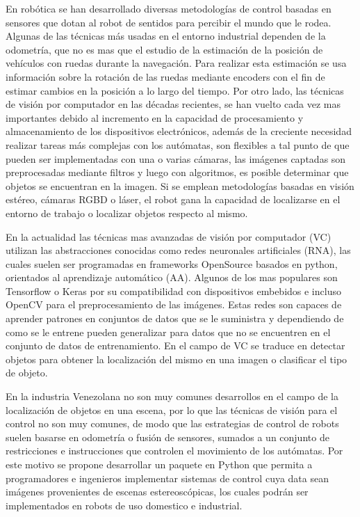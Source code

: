 \documentclass[letterpaper,titlepage,12pt,oneside,spanish,final]{report_eie}
\numberwithin{equation}{chapter}%
\numberwithin{figure}{chapter}%
\numberwithin{table}{chapter}%
\numberwithin{definition}{chapter}%
\numberwithin{lemma}{chapter}%
\numberwithin{theorem}{chapter}%
\numberwithin{corollary}{chapter}%
\numberwithin{condition}{chapter}%
\numberwithin{criterion}{chapter}%
\numberwithin{problem}{chapter}%
\numberwithin{property}{chapter}%
\numberwithin{proposition}{chapter}%
\numberwithin{solution}{chapter}%
\numberwithin{conjecture}{chapter}%
\begin{document}
En robótica se han desarrollado diversas metodologías de control basadas en sensores que dotan al robot de sentidos para percibir el mundo que le rodea. Algunas de las técnicas más usadas en el entorno industrial dependen de la odometría, que no es mas que el estudio de  la estimación de la posición de vehículos con ruedas durante la navegación. Para realizar esta estimación se usa información sobre la rotación de las ruedas mediante encoders con el fin de estimar cambios en la posición a lo largo del tiempo. Por otro lado, las técnicas de visión por computador en las décadas recientes, se han vuelto cada vez mas importantes debido al incremento en la capacidad de procesamiento y almacenamiento de los dispositivos electrónicos, además de la creciente necesidad realizar tareas más complejas con los autómatas, son flexibles a tal punto de que pueden ser implementadas con una o varias cámaras, las imágenes captadas son preprocesadas mediante filtros y luego con algoritmos, es posible determinar que objetos se encuentran en la imagen. Si se emplean metodologías basadas en visión estéreo, cámaras RGBD o láser, el robot gana la capacidad de localizarse en el entorno de trabajo o localizar objetos respecto al mismo.

En la actualidad las técnicas mas avanzadas de visión por computador (VC) utilizan las abstracciones conocidas como redes neuronales artificiales (RNA), las cuales suelen ser programadas en frameworks OpenSource basados en python, orientados al aprendizaje automático (AA). Algunos de los mas populares son Tensorflow o Keras por su compatibilidad con dispositivos embebidos  e incluso OpenCV para el preprocesamiento de las imágenes. Estas redes son capaces de aprender patrones en conjuntos de datos que se le suministra y dependiendo de como se le entrene pueden generalizar para datos que no se encuentren en el conjunto de datos de entrenamiento. En el campo de VC se traduce en detectar objetos para obtener la localización del mismo en una imagen o clasificar el tipo de objeto.

En la industria Venezolana no son muy comunes desarrollos en el campo de la localización de objetos en una escena, por lo que las técnicas de visión para el control no son muy comunes, de modo que las estrategias de control de robots suelen basarse en odometría o fusión de sensores, sumados a un conjunto de restricciones e instrucciones que controlen el movimiento de los autómatas. Por este motivo se propone desarrollar un paquete en Python que permita a programadores e ingenieros implementar sistemas de control cuya data sean imágenes provenientes de escenas estereoscópicas, los cuales podrán ser implementados en robots de uso domestico e industrial.
\end{document}
